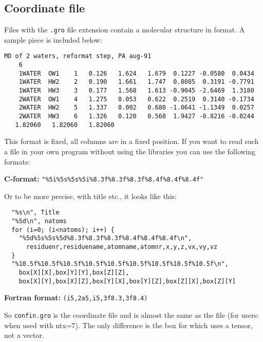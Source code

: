 \subsection{Coordinate file}
\label{subsec:grofile}
Files with the {\tt .gro} file extension contain a molecular structure in 
 format. A sample piece is included below:
{\small\begin{verbatim}
MD of 2 waters, reformat step, PA aug-91
    6
    1WATER  OW1    1   0.126   1.624   1.679  0.1227 -0.0580  0.0434
    1WATER  HW2    2   0.190   1.661   1.747  0.8085  0.3191 -0.7791
    1WATER  HW3    3   0.177   1.568   1.613 -0.9045 -2.6469  1.3180
    2WATER  OW1    4   1.275   0.053   0.622  0.2519  0.3140 -0.1734
    2WATER  HW2    5   1.337   0.002   0.680 -1.0641 -1.1349  0.0257
    2WATER  HW3    6   1.326   0.120   0.568  1.9427 -0.8216 -0.0244
   1.82060   1.82060   1.82060
\end{verbatim}}
This format is fixed, {\ie} all columns are in a fixed position. If you
want to read such a file in your own program without using the
{\gromacs} libraries you can use the following formats:

{\bf C-format:} \verb'"%5i%5s%5s%5i%8.3f%8.3f%8.3f%8.4f%8.4f%8.4f"'

Or to be more precise, with title etc., it looks like this:
\begin{verbatim}
  "%s\n", Title
  "%5d\n", natoms
  for (i=0; (i<natoms); i++) {
    "%5d%5s%5s%5d%8.3f%8.3f%8.3f%8.4f%8.4f%8.4f\n",
      residuenr,residuename,atomname,atomnr,x,y,z,vx,vy,vz
  }
  "%10.5f%10.5f%10.5f%10.5f%10.5f%10.5f%10.5f%10.5f%10.5f\n",
    box[X][X],box[Y][Y],box[Z][Z],
    box[X][Y],box[X][Z],box[Y][X],box[Y][Z],box[Z][X],box[Z][Y]
\end{verbatim}

{\bf Fortran format:} \verb'(i5,2a5,i5,3f8.3,3f8.4)'

So {\tt confin.gro} is the {\gromacs} coordinate file and is almost
the same as the  file (for {\gromos} users: when used with
ntx=7).  The only difference is the box for which {\gromacs} uses a
tensor, not a vector.
